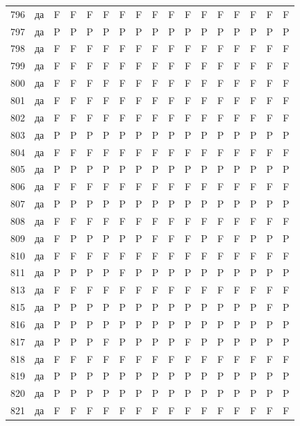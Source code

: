 \begin{table}[p]
\begin{tabular*}{\textwidth}{@{\extracolsep{\fill}}rcccccccccccccccc}
796 & да & F & F & F & F & F & F & F & F & F & F & F & F & F & F & F\\
797 & да & P & P & P & P & P & P & P & P & P & P & P & P & P & P & P\\
798 & да & F & F & F & F & F & F & F & F & F & F & F & F & F & F & F\\
799 & да & F & F & F & F & F & F & F & F & F & F & F & F & F & F & F\\
800 & да & F & F & F & F & F & F & F & F & F & F & F & F & F & F & F\\
801 & да & F & F & F & F & F & F & F & F & F & F & F & F & F & F & F\\
802 & да & F & F & F & F & F & F & F & F & F & F & F & F & F & F & F\\
803 & да & P & P & P & P & P & P & P & P & P & P & P & P & P & P & P\\
804 & да & F & F & F & F & F & F & F & F & F & F & F & F & F & F & F\\
805 & да & P & P & P & P & P & P & P & P & P & P & P & P & P & P & P\\
806 & да & F & F & F & F & F & F & F & F & F & F & F & F & F & F & F\\
807 & да & P & P & P & P & P & P & P & P & P & P & P & P & P & P & P\\
808 & да & F & F & F & F & F & F & F & F & F & F & F & F & F & F & F\\
809 & да & F & P & P & P & P & P & F & F & F & P & F & F & P & P & P\\
810 & да & F & F & F & F & F & F & F & F & F & F & F & F & F & F & F\\
811 & да & P & P & P & P & F & P & P & P & P & P & P & P & P & P & P\\
813 & да & F & F & F & F & F & F & F & F & F & F & F & F & F & F & F\\
815 & да & P & P & P & P & P & P & P & P & P & P & P & P & P & F & P\\
816 & да & P & P & P & P & P & P & P & P & P & P & P & P & P & P & P\\
817 & да & P & P & P & F & P & P & P & P & F & P & P & P & P & P & P\\
818 & да & F & F & F & F & F & F & F & F & F & F & F & F & F & F & F\\
819 & да & P & P & P & P & P & P & P & P & P & P & P & P & P & P & P\\
820 & да & P & P & P & P & P & P & P & P & P & P & P & P & P & P & P\\
821 & да & F & F & F & F & F & F & F & F & F & F & F & F & F & F & F\\
\bottomrule\end{tabular*}\end{table}
\clearpage

